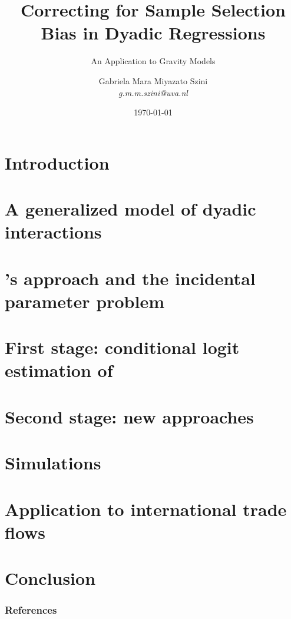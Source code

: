 \documentclass[10pt]{beamer}
\title[Sample Selection Bias in Dyadic Regressions] {Correcting for Sample Selection Bias in Dyadic Regressions} %
\subtitle[]{An Application to Gravity Models}
\author{Gabriela Mara Miyazato Szini \\ \small{\textit{g.m.m.szini@uva.nl}}} %
\institute[] %
{
Supervised by: Prof. Dr. Frank Kleibergen %
}
\date{\today} %
\begin{document}
\begin{frame}
  \titlepage %
\end{frame}

\section{Introduction}

\section{A generalized model of dyadic interactions}

\section{\cite{heckman1979sample}'s approach and the incidental parameter problem}


\section{First stage: conditional logit estimation of \cite{charbonneau2017multiple}}

\section{Second stage: new approaches}


\section{Simulations}

\section{Application to international trade flows}

\section{Conclusion}


\appendix
\begin{frame}[allowframebreaks]
  \frametitle{References}
  
  
\end{frame}






\end{document}
